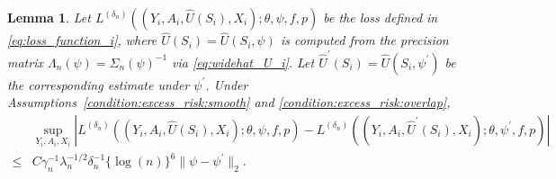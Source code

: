 \documentclass[12pt]{article}
\newtheorem{lemma}{Lemma}%
\begin{document}
\begin{lemma}\label{lemma:L_i_diff_psi}
    Let $L^{(\delta_n)}((Y_i,A_i,\widehat U(S_i),X_i);\theta,\psi,f,p)$ be the loss defined in \eqref{eq:loss_function_i}, where $\widehat U(S_i)=\widehat U(S_i,\psi)$ is computed from the precision matrix $\Lambda_n(\psi)=\Sigma_n(\psi)^{-1}$ via \eqref{eq:widehat_U_i}. Let $\widehat U^\prime(S_i)=\widehat U(S_i,\psi^\prime)$ be the corresponding estimate under $\psi^\prime$. Under Assumptions~\ref{condition:excess_risk:smooth} and \ref{condition:excess_risk:overlap},
    \begin{align*}
        &\sup_{Y_i,A_i,X_i}\left|L^{(\delta_n)}((Y_i,A_i,\widehat U(S_i),X_i);\theta,\psi,f,p) - L^{(\delta_n)}((Y_i,A_i,\widehat U^\prime(S_i),X_i);\theta,\psi^\prime,f,p)\right|\\
        \leq &  
        C\gamma_n^{-1}\lambda_n^{-1/2} \delta_n^{-1}\{\log(n)\}^6\|\psi - \psi^\prime\|_2.
    \end{align*}
\end{lemma}
\end{document}
